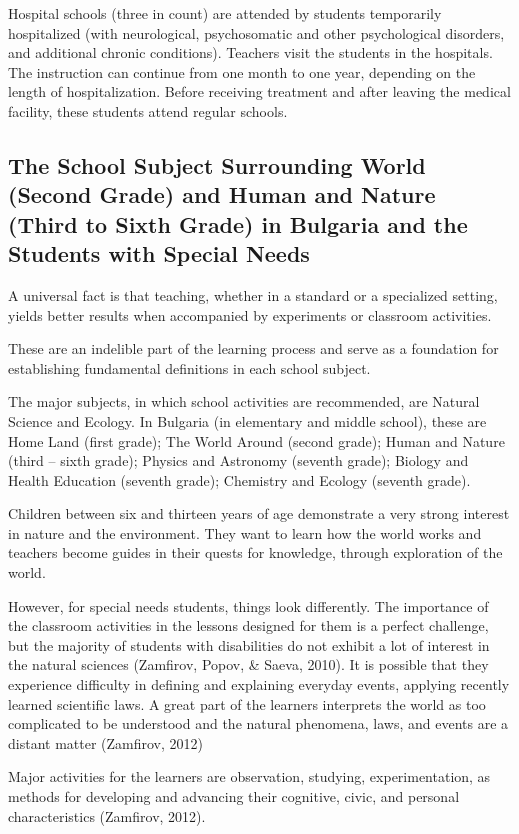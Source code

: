 \documentclass[11.5pt]{sig-alternate} %
\begin{document}
\begin{large}
Hospital schools (three in count) are attended by students temporarily hospitalized (with neurological, psychosomatic and other psychological disorders, and additional chronic conditions). Teachers visit the students in the hospitals. The instruction can continue from one month to one year, depending on the length of hospitalization. Before receiving treatment and after leaving the medical facility, these students attend regular schools.

\subsection*{The School Subject Surrounding World (Second Grade) and Human and Nature (Third to Sixth Grade) in Bulgaria and the Students with Special Needs}

A universal fact is that teaching, whether in a standard or a specialized setting, yields better results when accompanied by experiments or classroom activities. 

These are an indelible part of the learning process and serve as a foundation for establishing fundamental definitions in each school subject. 

The major subjects, in which school activities are recommended, are Natural Science and Ecology. In Bulgaria (in elementary and middle school), these are Home Land (first grade); The World Around (second grade); Human and Nature (third – sixth grade); Physics and Astronomy (seventh grade); Biology and Health Education (seventh grade); Chemistry and Ecology (seventh grade).

Children between six and thirteen years of age demonstrate a very strong interest in nature and the environment. They want to learn how the world works and teachers become guides in their quests for knowledge, through exploration of the world.

However, for special needs students, things look differently. The importance of the classroom activities in the lessons designed for them is a perfect challenge, but the majority of students with disabilities do not exhibit a lot of interest in the natural sciences (Zamfirov, Popov, \& Saeva, 2010). It is possible that they experience difficulty in defining and explaining everyday events, applying recently learned scientific laws. A great part of the learners interprets the world as too complicated to be understood and the natural phenomena, laws, and events are a distant matter (Zamfirov, 2012)

Major activities for the learners are observation, studying, experimentation, as methods for developing and advancing their cognitive, civic, and personal characteristics (Zamfirov, 2012).


\end{large}
\end{document}
